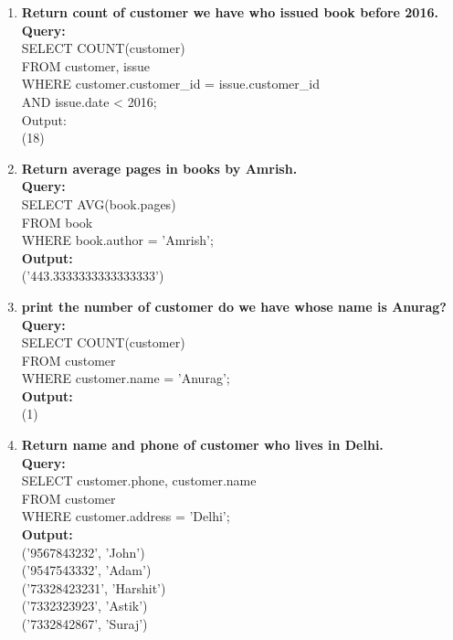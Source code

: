 \begin{enumerate}
\item \textbf{Return count of customer we have who issued book before 2016.}\\
\textbf{Query:}\\SELECT COUNT(customer)\\
FROM customer, issue\\
WHERE customer.customer\_id = issue.customer\_id\\
AND issue.date < 2016;\\
Output: \\
(18)

\item \textbf{Return average pages in books by Amrish.}\\
\textbf{Query:}\\SELECT AVG(book.pages)\\
FROM book\\
WHERE book.author = 'Amrish';\\
\textbf{Output:}\\
('443.3333333333333333')\\


\item \textbf{print the number of customer do we have whose name is Anurag?}\\
\textbf{Query:}\\SELECT COUNT(customer)\\
FROM customer\\
WHERE customer.name = 'Anurag';\\
\textbf{Output:}\\
(1)

\item \textbf{Return name and phone of customer who lives in Delhi.}\\
\textbf{Query:}\\SELECT customer.phone, customer.name\\
FROM customer\\
WHERE customer.address = 'Delhi';\\
\textbf{Output:}\\
('9567843232', 'John')\\
('9547543332', 'Adam')\\
('73328423231', 'Harshit')\\
('7332323923', 'Astik')\\
('7332842867', 'Suraj')\\


\end{enumerate}


